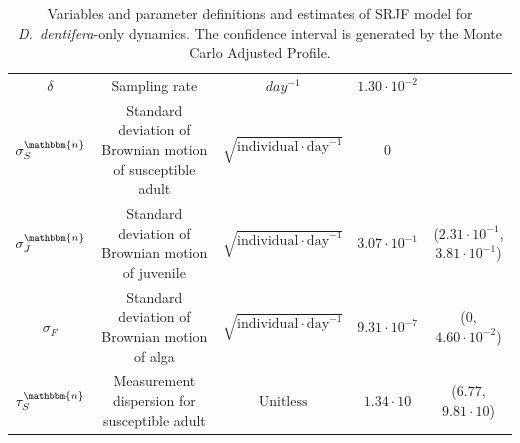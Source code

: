 \documentclass[aoas,preprint]{imsart}\usepackage[]{graphicx}\usepackage[]{xcolor}
\newcommand\native{\mathbbm{n}}
\begin{document}
\begin{table}[H]
{\begin{tabular}{||c|c |c|c|c||}
$\delta$        & Sampling rate                                      &  $day ^{-1}$                                                                         & $1.30\cdot 10^{-2}$ & \\
$\sigma^{\native}_{S}$ & Standard deviation of Brownian motion of susceptible adult               &   $\sqrt{\mathrm{individual} \cdot \mathrm{day}^{-1}}$  & 0  & \\
$\sigma^{\native}_{J}$ & Standard deviation of Brownian motion of juvenile               &   $\sqrt{\mathrm{individual} \cdot \mathrm{day}^{-1}}$  & $3.07\cdot 10^{-1}$  & ($2.31\cdot 10^{-1}$,$3.81\cdot 10^{-1}$)\\
$\sigma_{F}$   & Standard deviation of Brownian motion of alga                          &   $\sqrt{\mathrm{individual} \cdot \mathrm{day}^{-1}}$  & $9.31\cdot 10^{-7}$  & (0,$4.60\cdot 10^{-2}$)\\
$\tau^{\native}_{S}$      &  Measurement dispersion for susceptible adult          &$\mathrm{Unitless}$           & $1.34\cdot 10$  & ($6.77$,$9.81\cdot 10$)\\
\hline
\end{tabular}}
\caption{Variables and parameter definitions and estimates of SRJF model for \textit{D.~dentifera}-only dynamics. The confidence interval is generated by the Monte Carlo Adjusted Profile.}
\label{Table:SRJF_native}
\end{table}
\end{document}

